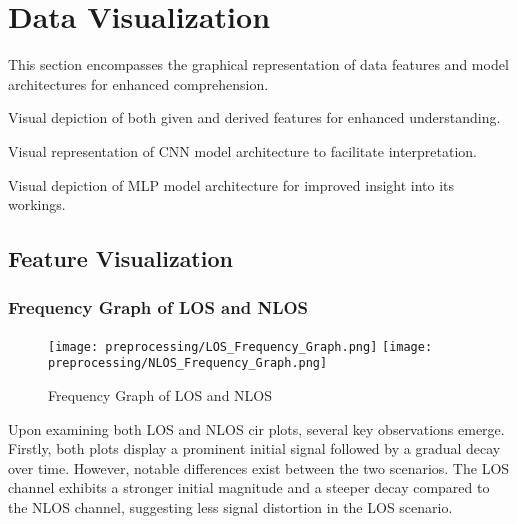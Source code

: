 \section{Data Visualization}\label{data_visualisation}

This section encompasses the graphical representation of data features and model architectures for enhanced comprehension.

\begin{description}[style=nextline]
    \item[Feature Visualization:] Visual depiction of both given and derived features for enhanced understanding.
    \item[Convolution Neural Network:] Visual representation of CNN model architecture to facilitate interpretation.
    \item[Multilayer Perceptron:] Visual depiction of MLP model architecture for improved insight into its workings.
\end{description}



\subsection{Feature Visualization}\label{feature_visualization}

\subsubsection{Frequency Graph of LOS and NLOS}\label{frequency_graph}

\begin{figure}[H] 
	\centering
	\texttt{[image: preprocessing/LOS\_Frequency\_Graph.png]}
	\texttt{[image: preprocessing/NLOS\_Frequency\_Graph.png]}
	\caption{Frequency Graph of LOS and NLOS}\label{fig:frequency_graph}
\end{figure}


Upon examining both LOS and NLOS \gls{cir} plots, several key observations emerge. Firstly, both plots display a prominent initial signal followed by a gradual decay over time. However, notable differences exist between the two scenarios. The LOS channel exhibits a stronger initial magnitude and a steeper decay compared to the NLOS channel, suggesting less signal distortion in the LOS scenario.

